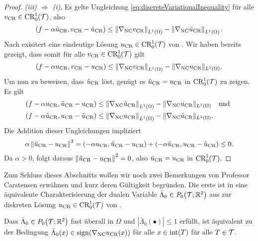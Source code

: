 \begin{proof}
  \textit{(iii) $\Rightarrow$ (i)}.
  Es gelte Ungleichung \eqref{eq:discreteVariationalInequality} für alle
  $v_\textup{CR}\in\textup{CR}^1_0(\mathcal{T})$, also
  \begin{align*}
    \left(f-\alpha\tilde{u}_{\textup{CR}},v_\textup{CR}-\tilde{u}_{\textup{CR}}\right) 
    \leq
    \left\Vert\nabla_\textup{NC}v_\textup{CR}\right\Vert_{L^1(\Omega)}
    -\left\Vert\nabla_\textup{NC}\tilde{u}_{\textup{CR}}\right\Vert_{L^1(\Omega)}.
  \end{align*}
  Nach  exisitert eine eindeutige
  Lösung $u_\textup{CR}\in\textup{CR}^1_0(\mathcal{T})$ von .
  Wir haben bereits gezeigt, dass somit für alle
  $v_\textup{CR}\in\textup{CR}^1_0(\mathcal{T})$ gilt
  \begin{align*}
    \left(f-\alpha u_\textup{CR},v_\textup{CR}-u_\textup{CR}\right) 
    \leq
    \left\Vert\nabla_\textup{NC}v_\textup{CR}\right\Vert_{L^1(\Omega)}
    -\Vert\nabla_\textup{NC}u_\textup{CR}\Vert_{L^1(\Omega)}.
  \end{align*}
  Um nun zu beweisen, dass $\tilde{u}_{\textup{CR}}$  löst, genügt
  es $\tilde{u}_{\textup{CR}}=u_\textup{CR}$ in $\textup{CR}^1_0(\mathcal{T})$ zu zeigen.
  Es gilt
  \begin{align*}
    \left(f-\alpha u_\textup{CR},\tilde{u}_{\textup{CR}}-u_\textup{CR}\right) 
    &\leq
    \left\Vert\nabla_\textup{NC}\tilde{u}_{\textup{CR}}\right\Vert_{L^1(\Omega)}
    -\Vert\nabla_\textup{NC}u_\textup{CR}\Vert_{L^1(\Omega)}\quad\text{und }\\
    \left(f-\alpha\tilde{u}_{\textup{CR}},u_\textup{CR}-\tilde{u}_{\textup{CR}}\right) 
    &\leq
    \left\Vert\nabla_\textup{NC}u_\textup{CR}\right\Vert_{L^1(\Omega)}
    -\Vert\nabla_\textup{NC}\tilde{u}_{\textup{CR}}\Vert_{L^1(\Omega)}. 
  \end{align*}
  Die Addition dieser Ungleichungen
  impliziert
  \begin{align*}
    \alpha\left\Vert\tilde{u}_{\textup{CR}}-u_\textup{CR}\right\Vert^2=
    \left(-\alpha u_\textup{CR},\tilde{u}_{\textup{CR}}-u_\textup{CR}\right) 
    + \left(-\alpha\tilde{u}_{\textup{CR}},u_\textup{CR}-\tilde{u}_{\textup{CR}}\right) 
    \leq
    0.
  \end{align*}
  Da $\alpha>0$, folgt daraus $\left\Vert\tilde{u}_{\textup{CR}}-u_\textup{CR}\right\Vert^2=0$,
  also $\tilde{u}_{\textup{CR}}=u_\textup{CR}$ in $\textup{CR}^1_0(\mathcal{T})$.
\end{proof}

Zum Schluss dieses Abschnitts wollen wir noch zwei Bemerkungen von Professor
Carstensen erwähnen und kurz deren Gültigkeit begründen.
Die erste ist in eine äquivalente Charakterisierung der dualen Variable
$\bar\Lambda_0\in P_0\!\left(\mathcal{T};\mathbb{R}^2\right)$ aus
 zur diskreten Lösung
$u_\textup{CR}\in\textup{CR}^1_0(\mathcal{T})$ von .

\begin{remark}
  Dass $\bar\Lambda_0\in P_0\!\left(\mathcal{T};\mathbb{R}^2\right)$ fast überall in $\Omega$
   und
  $|\bar\Lambda_0(\bullet)|\leq 1$ erfüllt, ist äquivalent zu der Bedingung
  $\bar\Lambda_0(x)\in\operatorname{sign}(\nabla_\textup{NC} u_\textup{CR}(x))$ für alle $x\in\operatorname{int}(T)$ für
  alle $T\in\mathcal{T}$.   
\end{remark}

